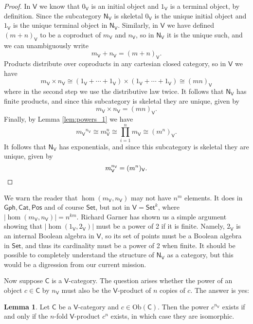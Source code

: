 \documentclass{amsart}
\theoremstyle{definition}
\newtheorem{lemma}[theorem]{Lemma}
\newcommand{\Gph}{\mathsf{Gph}}
\newcommand{\Set}{\mathsf{Set}}
\newcommand{\Cat}{\mathsf{Cat}}
\newcommand{\Pos}{\mathsf{Pos}}
\newcommand{\NN}{\mathsf{N}}
\newcommand{\V}{\mathsf{V}}
\newcommand{\C}{\mathsf{C}}
\newcommand{\Obj}{\mathrm{Ob}}
\begin{document}
\begin{proof}
 In $\V$ we know that $0_\V$ is an initial object and $1_\V$ is a terminal object, by
 definition.  Since the subcategory $\NN_\V$ is skeletal $0_\V$ is the unique 
 initial object and $1_\V$ is the unique terminal object in $\NN_\V$.   Similarly, in
 $\V$ we have defined $(m+n)_\V$ to be a coproduct of $m_\V$ and $n_\V$, so 
 in $\NN_\V$ it is the unique such, and we can unambiguously write 
 \[      m_\V + n_\V = (m + n)_\V .  \]
 Products distribute over coproducts in any cartesian closed category, so in $\V$ we have 
 \[   m_\V \times n_\V \cong (1_\V + \cdots + 1_\V) \times (1_\V + \cdots + 1_\V) 
 \cong (mn)_\V \]
 where in the second step we use the distributive law twice.
 It follows that $\NN_\V$ has finite products, and since this subcategory is skeletal
 they are unique, given by
 \[   m_\V \times n_\V = (mn)_\V.  \]
 Finally, by Lemma \ref{lem:powers_1} we have
 \[  {m_\V}^{n_\V} \cong m_\V^n \cong \prod_{i = 1}^n m_\V \cong
 (m^n)_\V .\]
 It follows that $\NN_\V$ has exponentials, and since this subcategory is skeletal they
 are unique, given by
 \[     m_\V^{n_\V} = (m^n)_\V .  \qedhere\]
\end{proof}

We warn the reader that $\hom(m_\V,n_\V)$ may not have $n^m$ elements.  It does
in $\Gph,\Cat,\Pos$ and of course $\Set$, but not in $\V = \Set^k$, where
$|\hom(m_\V, n_\V)| = n^{km}$.   Richard Garner has shown us a simple 
argument showing that $|\hom(1_\V,2_\V)|$ must be a power of 2 if it is
finite.   Namely, $2_\V$ is an internal Boolean algebra in $\V$, so its set of 
points must be a Boolean algebra in $\Set$, and thus its cardinality must be a power
of 2 when finite.  It should be possible to completely understand the structure of
$\NN_\V$ as a category, but this would be a digression from our current mission.

Now suppose $\C$ is a $\V$-category.   The question arises whether the
power of an object $c \in \C$ by $n_\V$ must also be the $\V$-product of $n$ copies
of $c$.   The answer is yes:

\begin{lemma}
\label{lem:powers_2}
Let $\C$ be a $\V$-category and $c \in \Obj(\C)$.  Then the power $c^{n_\V}$ exists
if and only if the $n$-fold $\V$-product $c^n$ exists, in which case they are isomorphic.
\end{lemma}
\end{document}
